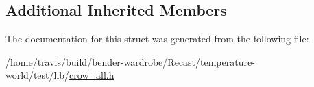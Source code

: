 \subsection*{Additional Inherited Members}


The documentation for this struct was generated from the following file\-:\begin{DoxyCompactItemize}
\item 
/home/travis/build/bender-\/wardrobe/\-Recast/temperature-\/world/test/lib/\hyperlink{crow__all_8h}{crow\-\_\-all.\-h}\end{DoxyCompactItemize}
